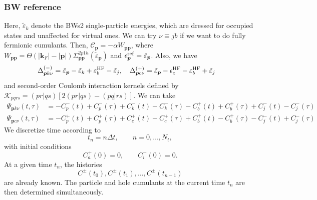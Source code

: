 \subsubsection{BW reference}
Here, $\tilde{\varepsilon}_{{k}}$ denote the BWs2 single-particle energies, which are dressed for occupied states and unaffected for virtual ones. We can try $\nu\equiv jb$ if we want to do fully fermionic cumulants. Then, $\mathcal{C}_{\bm{p}}=-\alpha W_{\bm{p}\bm{p}}$, where $W_{\bm{p}\bm{p}}=\Theta(|\bm{k}_F| - |\bm{p}|)\Sigma^{2p1h}_{\bm{p}\bm{p}}(\tilde{\varepsilon}_{\bm{p}})$ and $\epsilon_{\bm{p}}^{\rm ref}=\tilde{\varepsilon}_{\bm{p}}$. Also,
we have
\begin{align}
\Delta_{\bm{p}k\nu}^{(-)}
&=
\tilde{\varepsilon}_{\bm{p}}
-\tilde{\varepsilon}_k
+{\varepsilon_b^{\rm HF}} - \tilde{\varepsilon}_j, \quad \Delta_{\bm{p}c\nu}^{(+)}
=
\tilde{\varepsilon}_{\bm{p}}
-\epsilon_c^{\rm HF}
-{\varepsilon_b^{\rm HF}} + \tilde{\varepsilon}_j
\end{align}
and second-order Coulomb interaction kernels defined by $\mathcal K_{pqrs}=
(pr|qs)
\left[
2(pr|qs)-(pq|rs)
\right]$. We can take 
\begin{align}
\Psi_{\bm{p}k\nu}(t,\tau)
&=
-C_p^{-}(t)
+C_p^{-}(\tau)
+C_k^{-}(t)
-C_k^{-}(\tau) - C_b^{+}(t) + C_b^{+}(\tau) + C_j^{-}(t) - C_j^{-}(\tau) \\
\Psi_{\bm{p}c\nu}(t,\tau)
&=
-C_p^{+}(t)
+C_p^{+}(\tau)
+C_c^{+}(t)
-C_c^{+}(\tau) + C_b^{+}(t) - C_b^{+}(\tau) - C_j^{-}(t) + C_j^{-}(\tau)
\end{align}
We discretize time according to
\begin{equation}
t_n=n\Delta t,
\qquad
n=0,\ldots,N_t,
\end{equation}
with initial conditions
\begin{equation}
C_a^{+}(0)=0,
\qquad
C_i^{-}(0)=0.
\end{equation}
At a given time $t_n$, the histories
\begin{equation}
C^{\pm}(t_0),
C^{\pm}(t_1),
\ldots,
C^{\pm}(t_{n-1})
\end{equation}
are already known. The particle and hole cumulants at the current time $t_n$ are then determined simultaneously.

